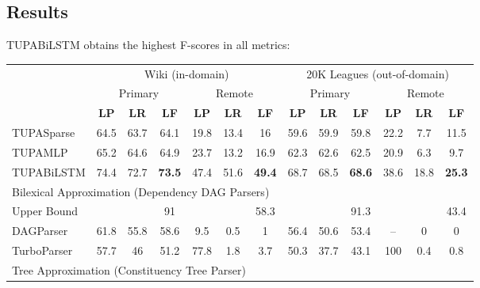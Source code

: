 \documentclass[a0,portrait]{a0poster}
\begin{document}
\begin{multicols}{2}
\section*{Results}

TUPA{BiLSTM} obtains the highest F-scores in all metrics:
	  
\begin{center}
	\begin{tabular}{l|ccc|ccc||ccc|ccc}
		& \multicolumn{6}{c||}{Wiki (in-domain)} & \multicolumn{6}{c}{20K Leagues (out-of-domain)} \\
		& \multicolumn{3}{c|}{Primary} & \multicolumn{3}{c||}{Remote}
		& \multicolumn{3}{c|}{Primary} & \multicolumn{3}{c}{Remote} \\
		& \textbf{LP} & \textbf{LR} & \textbf{LF} & \textbf{LP} & \textbf{LR} & \textbf{LF}
		& \textbf{LP} & \textbf{LR} & \textbf{LF} & \textbf{LP} & \textbf{LR} & \textbf{LF} \\
		\hline
		TUPA{Sparse}
		& 64.5 & 63.7 & 64.1 & 19.8 & 13.4 & 16
		& 59.6 & 59.9 & 59.8 & 22.2 & 7.7 & 11.5 \\
		TUPA{MLP}
		& 65.2 & 64.6 & 64.9 & 23.7 & 13.2 & 16.9
		& 62.3 & 62.6 & 62.5 & 20.9 & 6.3 & 9.7 \\
		TUPA{BiLSTM}
		& 74.4 & 72.7 & \textbf{73.5} & 47.4 & 51.6 & \textbf{49.4}
		& 68.7 & 68.5 & \textbf{68.6} & 38.6 & 18.8 & \textbf{25.3} \\
		\hline
		\multicolumn{8}{l}{\rule{0pt}{2ex} \footnotesize
		Bilexical Approximation (Dependency DAG Parsers)} \\
		\small Upper Bound
		& & & \small 91 & & & \small 58.3
		& & & \small 91.3 & & & \small 43.4 \\
		DAGParser \cite{ribeyre-villemontedelaclergerie-seddah:2014:SemEval}
		& 61.8 & 55.8 & 58.6 & 9.5 & 0.5 & 1
		& 56.4 & 50.6 & 53.4 & -- & 0 & 0 \\
		TurboParser \cite{almeida-martins:2015:SemEval}
		& 57.7 & 46 & 51.2 & 77.8 & 1.8 & 3.7
		& 50.3 & 37.7 & 43.1 & 100 & 0.4 & 0.8 \\
		\hline
		\multicolumn{8}{l}{\rule{0pt}{2ex} \footnotesize
		Tree Approximation (Constituency Tree Parser)} \\

\end{tabular}
\end{center}
\end{multicols}
\end{document}
